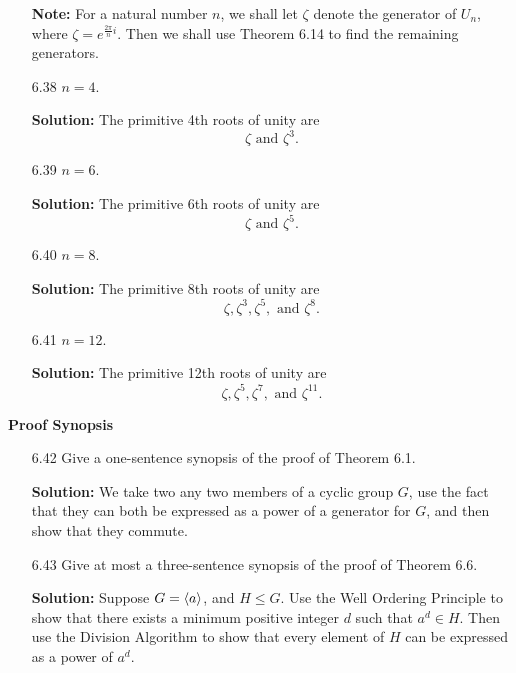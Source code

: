 \begin{enumerate}
   \item[\textbf{Note:}]
               For a natural number $n$, we shall let $\zeta$ denote the
               generator of $U_n$, where $\zeta = e^{\frac{2\pi}{n}i}$. Then we
               shall use Theorem 6.14 to find the remaining generators.
   \item[6.38] $n = 4$.

      \textbf{Solution:} The primitive 4th roots of unity are
      $$\zeta \text{ and } \zeta^3.$$
   \item[6.39] $n = 6$.

      \textbf{Solution:} The primitive 6th roots of unity are
      $$\zeta \text{ and } \zeta^5.$$
   \item[6.40] $n = 8$.

      \textbf{Solution:} The primitive 8th roots of unity are
      $$\zeta, \zeta^3, \zeta^5, \text{ and } \zeta^8.$$
   \item[6.41] $n = 12$.

      \textbf{Solution:} The primitive 12th roots of unity are
      $$\zeta, \zeta^5, \zeta^7, \text{ and } \zeta^{11}.$$
\end{enumerate}

\noindent      \textbf{Proof Synopsis}

\begin{enumerate}
   \item[6.42] Give a one-sentence synopsis of the proof of Theorem 6.1.

      \textbf{Solution:} We take two any two members of a cyclic group $G$, use 
      the fact that they can both be expressed as a power of a generator for
      $G$, and then show that they commute.
   \item[6.43] Give at most a three-sentence synopsis of the proof of Theorem
               6.6.

      \textbf{Solution:} Suppose $G = \langle a \rangle$, and $H \le G$. Use the Well 
      Ordering Principle to show that there exists a minimum positive integer
      $d$ such that $a^d \in H$. Then use the Division Algorithm to show that 
      every element of $H$ can be expressed as a power of $a^d$.
\end{enumerate}

